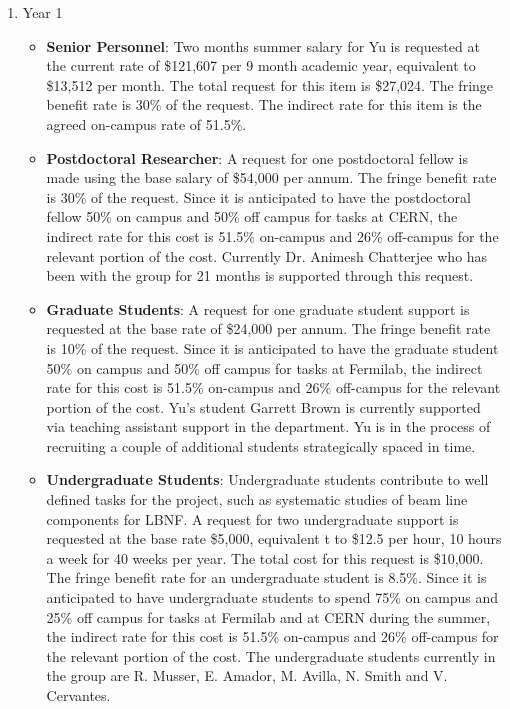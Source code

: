 \begin{enumerate}

\item{Year 1}
\begin{itemize}
\item{{\bf Senior Personnel}: Two months summer salary for Yu is requested at the current rate of \$121,607 per 9 month academic year, equivalent to \$13,512 per month.  The total request for this item is \$27,024.   The fringe benefit rate is 30\% of the request.  The indirect rate for this item is the agreed on-campus rate of 51.5\%.}

\item{{\bf Postdoctoral Researcher}: A request for one postdoctoral fellow is made using the base salary of \$54,000 per annum.  The fringe benefit rate is 30\% of the request.  Since it is anticipated to have the postdoctoral fellow 50\% on campus and 50\% off campus for tasks at CERN, the indirect rate for this cost is 51.5\% on-campus and 26\% off-campus for the relevant portion of the cost.  Currently Dr. Animesh Chatterjee who has been with the group for 21 months is supported through this request.} 

\item{{\bf Graduate Students}: A request for one graduate student support is requested at the base rate of \$24,000 per annum.   The fringe benefit rate is 10\% of the request.  Since it is anticipated to have the graduate student 50\% on campus and 50\% off campus for tasks at Fermilab, the indirect rate for this cost is 51.5\% on-campus and 26\% off-campus for the relevant portion of the cost.   Yu’s student Garrett Brown is currently supported via teaching assistant support in the department.   Yu is in the process of recruiting a couple of additional students strategically spaced in time. }

\item{{\bf Undergraduate Students}: Undergraduate students contribute to well defined tasks for the project, such as systematic studies of beam line components for LBNF.  A request for two undergraduate support is requested at the base rate \$5,000, equivalent t to \$12.5 per hour, 10 hours a week for 40 weeks per year.  The total cost for this request is \$10,000.  The fringe benefit rate for an undergraduate student is 8.5\%.  Since it is anticipated to have undergraduate students to spend 75\% on campus and 25\% off campus for tasks at Fermilab and at CERN during the summer, the indirect rate for this cost is 51.5\% on-campus and 26\% off-campus for the relevant portion of the cost.   The undergraduate students currently in the group are R. Musser,  E. Amador, M. Avilla, N. Smith and V. Cervantes.}


\end{itemize}
\end{enumerate}
